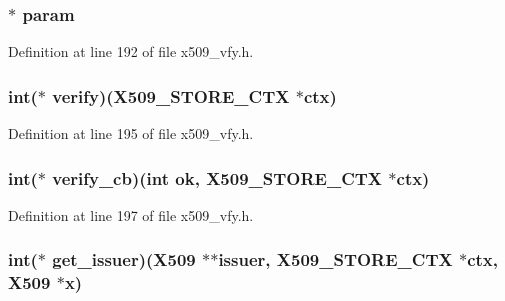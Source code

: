 \subsubsection[{\texorpdfstring{param}{param}}]{ $\ast$ param}\hypertarget{structx509__store__st_a93a023e30bcb76ab78c9bdb0db7a24f8}{}\label{structx509__store__st_a93a023e30bcb76ab78c9bdb0db7a24f8}


Definition at line 192 of file x509\+\_\+vfy.\+h.

\subsubsection[{\texorpdfstring{verify}{verify}}]{\setlength{\rightskip}{0pt plus 5cm}int($\ast$ verify)({\bf X509\+\_\+\+S\+T\+O\+R\+E\+\_\+\+C\+TX} $\ast$ctx)}\hypertarget{structx509__store__st_ac3a2bd38c545830a826a7d26031473d1}{}\label{structx509__store__st_ac3a2bd38c545830a826a7d26031473d1}


Definition at line 195 of file x509\+\_\+vfy.\+h.

\subsubsection[{\texorpdfstring{verify\+\_\+cb}{verify_cb}}]{\setlength{\rightskip}{0pt plus 5cm}int($\ast$ verify\+\_\+cb)(int ok, {\bf X509\+\_\+\+S\+T\+O\+R\+E\+\_\+\+C\+TX} $\ast$ctx)}\hypertarget{structx509__store__st_a7a498a0e2b66a935922a642eeebfc183}{}\label{structx509__store__st_a7a498a0e2b66a935922a642eeebfc183}


Definition at line 197 of file x509\+\_\+vfy.\+h.

\subsubsection[{\texorpdfstring{get\+\_\+issuer}{get_issuer}}]{\setlength{\rightskip}{0pt plus 5cm}int($\ast$ get\+\_\+issuer)({\bf X509} $\ast$$\ast$issuer, {\bf X509\+\_\+\+S\+T\+O\+R\+E\+\_\+\+C\+TX} $\ast$ctx, {\bf X509} $\ast${\bf x})}\hypertarget{structx509__store__st_ac4f2db1b4c777ae1a8e1825848e6544c}{}\label{structx509__store__st_ac4f2db1b4c777ae1a8e1825848e6544c}


